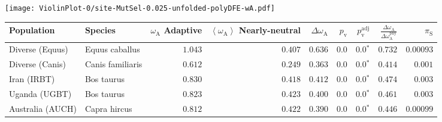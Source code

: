 \begin{center}
\texttt{[image: ViolinPlot-0/site-MutSel-0.025-unfolded-polyDFE-wA.pdf]} 
\begin{adjustbox}{width = 1\textwidth}
\begin{tabular}{|l|l|r|r|r|r|r|r|r|}
\toprule
                     Population &              Species & \specialcell{$\omega_{\mathrm{A}}$ \\ Adaptive} & \specialcell{$\left< \omega_{\mathrm{A}} \right>$ \\ Nearly-neutral} & $\Delta \omega_{\mathrm{A}} $ & $p_{\mathrm{v}}$ & $p_{\mathrm{v}}^{\mathrm{adj}}$ & $\frac{\Delta\omega_{\mathrm{A}}}{\Delta\omega_{\mathrm{A}}^{\mathrm{phy}}}$ & $\pi_{\textrm{S}}$ \\
\midrule
                Diverse (Equus) &       Equus caballus &                                        $ 1.043$ &                                           $ 0.407$ &                      $ 0.636$ &            $0.0$ &                  $\bm{0.0{^*}}$ &                                           $ 0.732$ &          $0.00093$ \\
                Diverse (Canis) &     Canis familiaris &                                        $ 0.612$ &                                           $ 0.249$ &                      $ 0.363$ &            $0.0$ &                  $\bm{0.0{^*}}$ &                                           $ 0.414$ &           $ 0.001$ \\
                    Iran (IRBT) &           Bos taurus &                                        $ 0.830$ &                                           $ 0.418$ &                      $ 0.412$ &            $0.0$ &                  $\bm{0.0{^*}}$ &                                           $ 0.474$ &           $ 0.003$ \\
                  Uganda (UGBT) &           Bos taurus &                                        $ 0.823$ &                                           $ 0.423$ &                      $ 0.400$ &            $0.0$ &                  $\bm{0.0{^*}}$ &                                           $ 0.461$ &           $ 0.003$ \\
               Australia (AUCH) &         Capra hircus &                                        $ 0.812$ &                                           $ 0.422$ &                      $ 0.390$ &            $0.0$ &                  $\bm{0.0{^*}}$ &                                           $ 0.446$ &          $0.00099$ \\

\end{tabular}
\end{adjustbox}
\end{center}

